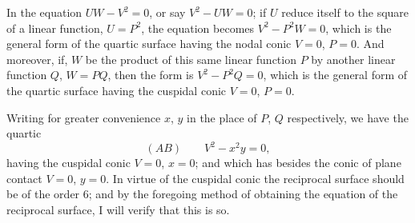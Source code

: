 \documentclass[11pt,a4paper]{article}
\begin{document}
In the equation $UW - V^{2} = 0$, or say $V^{2} - UW = 0$; if $U$ reduce itself to the square of a linear function, $U = P^{2}$, the equation becomes $V^{2} - P^{2}W = 0$, which is the general form of the quartic surface having the nodal conic $V=0$, $P=0$. And moreover, if, $W$ be the product of this same linear function $P$ by another linear function $Q$, $W = PQ$, then the form is $V^{2} - P^{2}Q = 0$, which is the general form of the quartic surface having the cuspidal conic $V=0$, $P=0$.

Writing for greater convenience $x$, $y$ in the place of $P$, $Q$ respectively, we have the quartic
\[
(AB)\qquad V^{2} - x^{2}y = 0,
\]
having the cuspidal conic $V=0$, $x=0$; and which has besides the conic of plane contact $V=0$, $y=0$. In virtue of the cuspidal conic the reciprocal surface should be of the order 6; and by the foregoing method of obtaining the equation of the reciprocal surface, I will verify that this is so.
\end{document}
